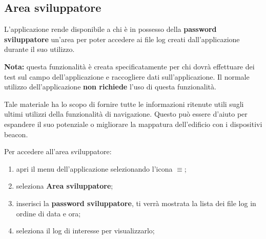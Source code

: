 \documentclass[../ClipsManualeUtente.tex]{subfiles}
\begin{document}
		
	\newpage
	\subsection{Area sviluppatore}
		L'applicazione rende disponibile a chi è in possesso della \textbf{password sviluppatore} un'area per poter accedere ai file log creati dall'applicazione durante il suo utilizzo.
		
		\begin{framed}
			\textbf{Nota:} questa funzionalità è creata specificatamente per chi dovrà effettuare dei test sul campo dell'applicazione e raccogliere dati sull'applicazione. Il normale utilizzo dell'applicazione \textbf{non richiede} l'uso di questa funzionalità.
		\end{framed}
		
		Tale materiale ha lo scopo di fornire tutte le informazioni ritenute utili sugli ultimi utilizzi della  funzionalità di navigazione. Questo può essere d'aiuto per espandere il suo potenziale o migliorare la mappatura dell'edificio con i dispositivi beacon.
		
		Per accedere all'area sviluppatore:
		\begin{enumerate}
			\item apri il menu dell'applicazione selezionando l'icona $\equiv$;
			\item seleziona \textbf{Area sviluppatore}; %
			\item inserisci la \textbf{password sviluppatore}, ti verrà mostrata la lista dei file log in ordine di data e ora;
			\item seleziona il log di interesse per visualizzarlo; 
		\end{enumerate}
\end{document}

